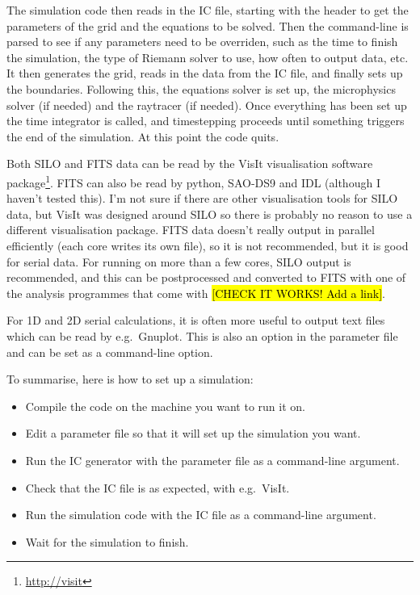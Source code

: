 \documentclass[a4paper,11pt]{report}
\begin{document}
The simulation code then reads in the IC file, starting with the header to get the parameters of the grid and the equations to be solved.
Then the command-line is parsed to see if any parameters need to be overriden, such as the time to finish the simulation, the type of Riemann solver to use, how often to output data, etc.
It then generates the grid, reads in the data from the IC file, and finally sets up the boundaries.
Following this, the equations solver is set up, the microphysics solver (if needed) and the raytracer (if needed).
Once everything has been set up the time integrator is called, and timestepping proceeds until something triggers the end of the simulation.
At this point the code quits.


Both SILO and FITS data can be read by the VisIt visualisation software package\footnote{\url{http://visit}}.
FITS can also be read by python, SAO-DS9 and IDL (although I haven't tested this).
I'm not sure if there are other visualisation tools for SILO data, but VisIt was designed around SILO so there is probably no reason to use a different visualisation package.
FITS data doesn't really output in parallel efficiently (each core writes its own file), so it is not recommended, but it is good for serial data.
For running on more than a few cores, SILO output is recommended, and this can be postprocessed and converted to FITS with one of the analysis programmes that come with \pion{} \hl{[CHECK IT WORKS!  Add a link]}.

For 1D and 2D serial calculations, it is often more useful to output text files which can be read by e.g.\ Gnuplot.
This is also an option in the parameter file and can be set as a command-line option.

To summarise, here is how to set up a simulation:
\begin{itemize}
\item Compile the code on the machine you want to run it on.
\item Edit a parameter file so that it will set up the simulation you want.
\item Run the IC generator with the parameter file as a command-line argument.
\item Check that the IC file is as expected, with e.g.\ VisIt.
\item Run the simulation code with the IC file as a command-line argument.
\item Wait for the simulation to finish.
\end{itemize}
\end{document}
